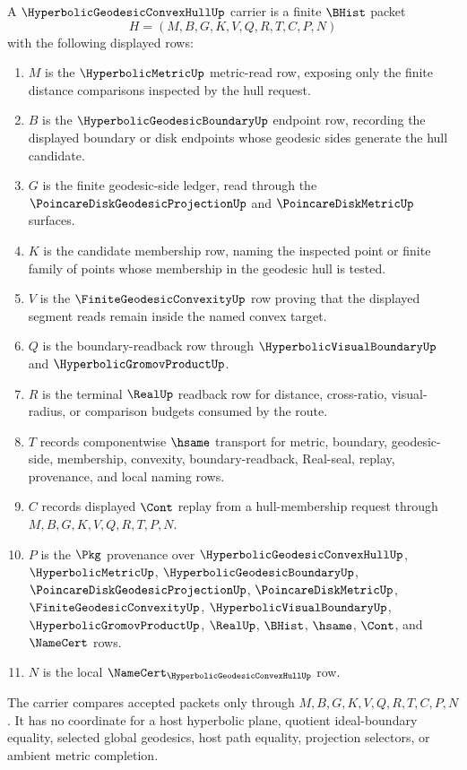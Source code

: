 \begin{definition}
\label{def:hyperbolic-geodesic-convex-hull-packet}
A $\HyperbolicGeodesicConvexHullUp$ carrier is a finite $\BHist$ packet
$$
H=(M,B,G,K,V,Q,R,T,C,P,N)
$$
with the following displayed rows:
\begin{enumerate}
\item $M$ is the $\HyperbolicMetricUp$ metric-read row, exposing only the finite distance comparisons inspected by the hull request.
\item $B$ is the $\HyperbolicGeodesicBoundaryUp$ endpoint row, recording the displayed boundary or disk endpoints whose geodesic sides generate the hull candidate.
\item $G$ is the finite geodesic-side ledger, read through the $\PoincareDiskGeodesicProjectionUp$ and $\PoincareDiskMetricUp$ surfaces.
\item $K$ is the candidate membership row, naming the inspected point or finite family of points whose membership in the geodesic hull is tested.
\item $V$ is the $\FiniteGeodesicConvexityUp$ row proving that the displayed segment reads remain inside the named convex target.
\item $Q$ is the boundary-readback row through $\HyperbolicVisualBoundaryUp$ and $\HyperbolicGromovProductUp$.
\item $R$ is the terminal $\RealUp$ readback row for distance, cross-ratio, visual-radius, or comparison budgets consumed by the route.
\item $T$ records componentwise $\hsame$ transport for metric, boundary, geodesic-side, membership, convexity, boundary-readback, Real-seal, replay, provenance, and local naming rows.
\item $C$ records displayed $\Cont$ replay from a hull-membership request through $M,B,G,K,V,Q,R,T,P,N$.
\item $P$ is the $\Pkg$ provenance over $\HyperbolicGeodesicConvexHullUp$, $\HyperbolicMetricUp$, $\HyperbolicGeodesicBoundaryUp$, $\PoincareDiskGeodesicProjectionUp$, $\PoincareDiskMetricUp$, $\FiniteGeodesicConvexityUp$, $\HyperbolicVisualBoundaryUp$, $\HyperbolicGromovProductUp$, $\RealUp$, $\BHist$, $\hsame$, $\Cont$, and $\NameCert$ rows.
\item $N$ is the local $\NameCert_{\HyperbolicGeodesicConvexHullUp}$ row.
\end{enumerate}
The carrier compares accepted packets only through $M,B,G,K,V,Q,R,T,C,P,N$. It has no coordinate for a host hyperbolic plane, quotient ideal-boundary equality, selected global geodesics, host path equality, projection selectors, or ambient metric completion.
\end{definition}

